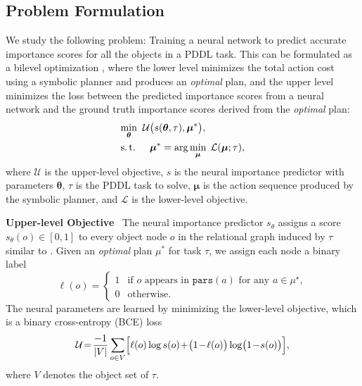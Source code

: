 \documentclass[letterpaper, 10pt, journal, twoside]{IEEEtran}
\newcommand{\myparagraph}[1]{\noindent\textbf{#1}~}
\begin{document}
\subsection{Problem Formulation}\label{sec:problem_formulation}
We study the following problem: Training a neural network to predict accurate importance scores for all the objects in a PDDL task.
This can be formulated as a bilevel optimization \cite{wang2025imperative}, where the lower level minimizes the total action cost using a symbolic planner and produces an \emph{optimal} plan, and the upper level minimizes the loss between the predicted importance scores from a neural network and the ground truth importance scores derived from the \emph{optimal} plan:
\begin{subequations}
\label{eq:bilevel}
\begin{align}
\min_{\bm{\theta}}\;&\;\mathcal U\bigl(s(\bm{\theta},\tau),\bm{\mu}^*\bigr),\\
  \text{s.\,t. } & \quad
      \bm{\mu}^* = \arg\min_{\bm{\mu}}\;
      \mathcal L(\bm{\mu};\tau),\label{eq:low-opt}
\end{align}
\end{subequations} where $\mathcal U$ is the upper-level objective, $s$ is the neural importance predictor with parameters $\bm{\theta}$, $\tau$ is the PDDL task to solve, $\bm{\mu}$ is the action sequence produced by the symbolic planner, and $\mathcal L$ is the lower-level objective.

\myparagraph{Upper-level Objective}
The neural importance predictor $s_{\theta}$ assigns a score $s_{\theta}(o)\in[0,1]$ to every object node $o$ in the relational graph induced by $\tau$ similar to \cite{silver2021planning}. 
Given an \emph{optimal} plan $\mu^*$ for task $\tau$, we assign each node a binary label
\[
  \ell(o)=
  \begin{cases}
     1 & \text{if } o \text{ appears in }\mathtt{pars}(a)\text{ for any }
         a \in \mu^{\star},\\[2pt]
     0 & \text{otherwise.}
  \end{cases}
\]
The neural parameters are learned by minimizing the lower-level objective, which is a binary cross-entropy (BCE) loss
\begin{equation}
\begin{split}
  \mathcal{U}%
  \!=\!\frac{-1}{|V|} \sum_{o \in V} \Bigl[
    \ell(o)\log s(o)
    \!+\!\bigl(1\!-\!\ell(o)\bigr)\log\bigl(1\!-\!s(o)\bigr)
  \Bigr],
\end{split}
\label{eq:bce}
\end{equation}
where $V$ denotes the object set of $\tau$.
\end{document}
